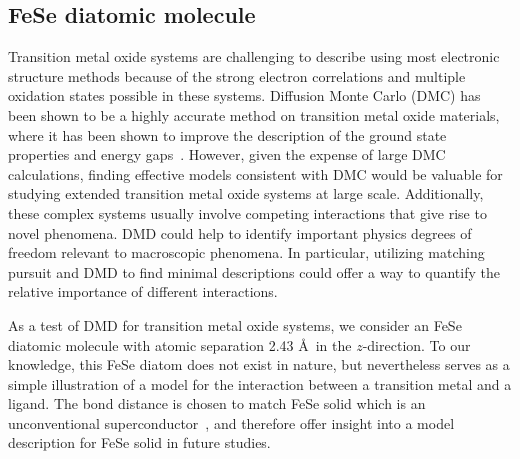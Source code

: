 \subsection{FeSe diatomic molecule}
\label{subsection:fese}
Transition metal oxide systems are challenging to describe using most electronic structure methods because of the strong electron correlations and multiple oxidation states possible in these systems. %
Diffusion Monte Carlo (DMC) has been shown to be a highly accurate method on transition metal oxide materials, where it has been shown to improve the description of the ground state properties and energy gaps~\cite{Foyevtsova2014, Wagner_Abbamonte, Zheng2015, Wagner2016}. %
However, given the expense of large DMC calculations, finding effective models consistent with DMC would be valuable for studying extended transition metal oxide systems at large scale.
Additionally, these complex systems usually involve competing interactions that give rise to novel phenomena. 
DMD could help to identify important physics degrees of freedom relevant to macroscopic phenomena.
In particular, utilizing matching pursuit and DMD to find minimal descriptions could offer a way to quantify the relative importance of different interactions.

As a test of DMD for transition metal oxide systems, we consider an FeSe diatomic molecule with atomic separation 2.43 \AA~in the $z$-direction.
To our knowledge, this FeSe diatom does not exist in nature, but nevertheless serves as a simple illustration of a model for the interaction between a transition metal and a ligand. 
The bond distance is chosen to match FeSe solid which is an unconventional superconductor~\cite{kumar_crystal_2010}, and therefore offer insight into a model description for FeSe solid in future studies.

